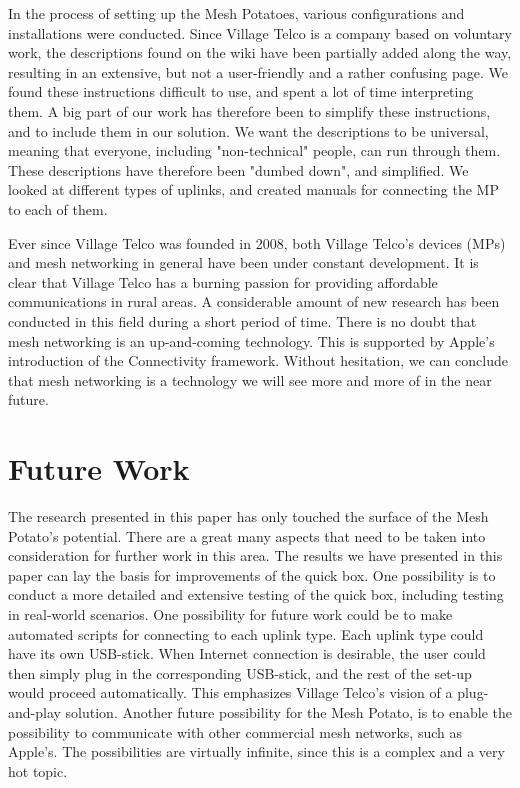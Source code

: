 In the process of setting up the Mesh Potatoes, various configurations and installations were conducted. Since Village Telco is a company based on voluntary work, the descriptions found on the wiki have been partially added along the way, resulting in an extensive, but not a user-friendly and a rather confusing page. We found these instructions difficult to use, and spent a lot of time interpreting them. A big part of our work has therefore been to simplify these instructions, and to include them in our solution. We want the descriptions to be universal, meaning that everyone, including "non-technical" people, can run through them. These descriptions have therefore been "dumbed down", and simplified. We looked at different types of uplinks, and created manuals for connecting the MP to each of them. 

Ever since Village Telco was founded in 2008, both Village Telco's devices (MPs) and mesh networking in general have been under constant development. It is clear that Village Telco has a burning passion for providing affordable communications in rural areas. A considerable amount of new research has been conducted in this field during a short period of time. There is no doubt that mesh networking is an up-and-coming technology. This is supported by Apple's introduction of the Connectivity framework. Without hesitation, we can conclude that mesh networking is a technology we will see more and more of in the near future.  

\section{Future Work}
The research presented in this paper has only touched the surface of the Mesh Potato's potential. There are a great many aspects that need to be taken into consideration for further work in this area. The results we have presented in this paper can lay the basis for improvements of the \gls{quick} box. One possibility is to conduct a more detailed and extensive testing of the \gls{quick} box, including testing in real-world scenarios. One possibility for future work could be to make automated scripts for connecting to each uplink type. Each uplink type could have its own USB-stick. When Internet connection is desirable, the user could then simply plug in the corresponding USB-stick, and the rest of the set-up would proceed automatically. This emphasizes Village Telco's vision of a plug-and-play solution. Another future possibility for the Mesh Potato, is to enable the possibility to communicate with other commercial mesh networks, such as Apple's. The possibilities are virtually infinite, since this is a complex and a very hot topic.

